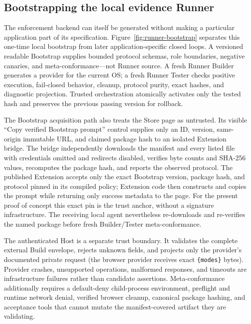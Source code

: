 \documentclass[10pt]{article}
\begin{document}
\subsection{Bootstrapping the local evidence Runner}

The enforcement backend can itself be generated without making a particular application part
of its specification. Figure~\ref{fig:runner-bootstrap} separates this one-time local bootstrap
from later application-specific closed loops. A versioned readable Bootstrap supplies bounded
protocol schemas, role boundaries, negative canaries, and meta-conformance---not Runner source.
A fresh Runner Builder generates a provider for the current OS; a fresh Runner Tester checks
positive execution, fail-closed behavior, cleanup, protocol purity, exact hashes, and diagnostic
projection. Trusted orchestration atomically activates only the tested hash and preserves the
previous passing version for rollback.

The Bootstrap acquisition path also treats the Store page as untrusted. Its visible
``Copy verified Bootstrap prompt'' control supplies only an ID, version, same-origin immutable
URL, and claimed package hash to an isolated Extension bridge. The bridge independently downloads
the manifest and every listed file with credentials omitted and redirects disabled, verifies byte
counts and SHA-256 values, recomputes the package hash, and reports the observed protocol. The
published Extension accepts only the exact Bootstrap version, package hash, and protocol pinned in
its compiled policy; Extension code then constructs and copies the prompt while returning only
success metadata to the page. For the present proof of concept this exact pin is the trust anchor,
without a signature infrastructure. The receiving local agent nevertheless re-downloads and
re-verifies the named package before fresh Builder/Tester meta-conformance.

The authenticated Host is a separate trust boundary. It validates the complete external Build
envelope, rejects unknown fields, and projects only the provider's documented private request
(the browser provider receives exact \texttt{\{modes\}} bytes). Provider crashes, unsupported
operations, malformed responses, and timeouts are infrastructure failures rather than candidate
assertions. Meta-conformance additionally requires a default-deny child-process environment,
preflight and runtime network denial, verified browser cleanup, canonical package hashing, and
acceptance tools that cannot mutate the manifest-covered artifact they are validating.
\end{document}
